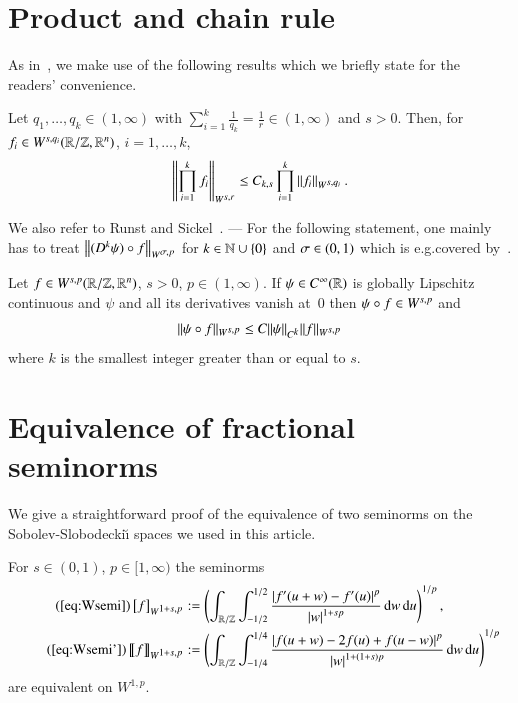 
\section{Product and chain rule}\label{sect:fractional}

As in~\cite{blatt-reiter2}, we make use of the following results which
we briefly state for the readers' convenience.

\begin{lemma}\label{lem:product}
  Let $q_1,\dots,q_{k} \in (1,\infty)$ with $\sum_{i=1}^{k}\frac1{q_{k}}=\frac1r\in(1,\infty)$ and 
  $s > 0$.
  Then, for $f_{i}\in\W[s,q_{i}]\rzd$, $i=1,\dots,k$,
 \begin{equation*}
  \norm{\prod_{i=1}^{k} f_{i}}_{\W[s,r]} \leq C_{k,s} \prod_{i=1}^{k}\norm{f_{i}}_{\W[s,q_{i}]}.
 \end{equation*}
\end{lemma}

We also refer to Runst and Sickel~{\cite[Lem.~5.3.7/1~(i)]{RS}}. ---
For the following statement, one mainly has to treat $\norm{(D^k\psi)\circ f}_{\W[\s,p]}$ for $k\in\N\cup\set0$ and $\s\in(0,1)$
which is e.g.\@ covered by~\cite[Thm.~5.3.6/1~(i)]{RS}.

\begin{lemma}\label{lem:chain}
 Let $f\in\W[s,p](\mathbb R / \mathbb Z, \mathbb R^n)$, $s > 0$, $p \in (1,\infty)$.
 If $\psi\in C^\infty(\R)$ is globally Lipschitz continuous and $\psi$ and all its derivatives vanish at~$0$ then $\psi\circ f\in\W[s,p]$ and
 \[ \|\psi \circ f\|_{\W[s,p]} \le C\|\psi\|_{C^{\scriptstyle k}}\|f\|_{\W[s,p]} \]
 where $k$ is the smallest integer greater than or equal to $s$.
\end{lemma}

\section{Equivalence of fractional seminorms}\label{sect:equiv}

We give a straightforward
proof of the equivalence of two seminorms on the Sobolev-Slobodecki\u{\i} spaces we used in this article.

\begin{lemma}\label{lem:equivalenceOfNorms}
 For $s \in (0,1)$, $p\in[1,\infty)$ the seminorms
 \begin{align}\tag{\ref{eq:Wsemi}}
 \seminorm{f}_{\W[1+s,p]} &:= \br{\int_{{\R/\Z}}\int_{-1/2}^{1/2}
 \frac{\abs{f'(u+w)-f'(u)}^p}{\abs w^{1+sp}} \d w\d u}^{1/p}, \\
 \tag{\ref{eq:Wsemi'}}
 \seminormv{f}_{\W[1+s,p]} &:= \br{\int_{{\R/\Z}}\int_{-1/4}^{1/4}
 \frac{\abs{f(u+w)-2f(u)+f(u-w)}^p}{\abs w^{1+(1+s)p}} \d w\d u}^{1/p}
 \end{align}
 are equivalent on $W^{1,p}$.
\end{lemma}

